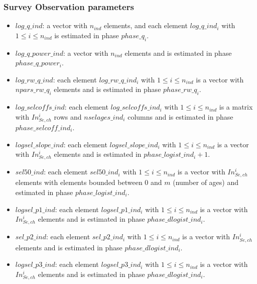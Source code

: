 \documentclass{article}
\begin{document}
\subsubsection{Survey Observation parameters}

\begin{itemize}
    \item $log\_q\_ind$: a vector with $n_{ind}$ elements, and each element $log\_q\_ind_i$ with $1\leq i \leq n_{ind}$ is estimated in phase $phase\_q_i$. 
     
    \item $log\_q\_power\_ind$: a vector with $n_{ind}$ elements and is estimated in phase $phase\_q\_power_i$.
    
    \item $log\_rw\_q\_ind$: each element $log\_rw\_q\_ind_i$ with $1\leq i \leq n_{ind}$ is a vector with $npars\_rw\_q_i$ elements and is estimated in phase $phase\_rw\_q_i$.
    
    \item $log\_selcoffs\_ind$: each element $log\_selcoffs\_ind_i$ with $1\leq i \leq n_{ind}$ is a matrix with $In_{Se,ch}^i$
    rows and $nselages\_ind_i$ columns and is estimated in phase $phase\_selcoff\_ind_i$.
     
    \item $logsel\_slope\_ind$: each element $logsel\_slope\_ind_i$ with $1\leq i \leq n_{ind}$ is a vector with $In_{Se,ch}^i$ %
    elements and is estimated in $phase\_logist\_ind_i+1$.
    
    \item $sel50\_ind$: each element $sel50\_ind_i$ with $1\leq i \leq n_{ind}$ is a vector with $In_{Se,ch}^i$ %
    elements with elements bounded between 0 and $m$ (number of ages) and estimated in phase $phase\_logist\_ind_i$. 
     
    \item $logsel\_p1\_ind$: each element $logsel\_p1\_ind_i$ with $1\leq i \leq n_{ind}$ is a vector with $In_{Se,ch}^i$%
    elements and is estimated in phase $phase\_dlogist\_ind_i$.
    
    \item $sel\_p2\_ind$: each element $sel\_p2\_ind_i$  with $1\leq i \leq n_{ind}$ is a vector with $In_{Se,ch}^i$%
    elements and is estimated in phase $phase\_dlogist\_ind_i$.
     
    \item $logsel\_p3\_ind$: each element $logsel\_p3\_ind_i$ with $1\leq  i \leq n_{ind}$ is a vector with $In_{Se,ch}^i$ %
    elements and is estimated in phase $phase\_dlogist\_ind_i$.

\end{itemize}
\end{document}
